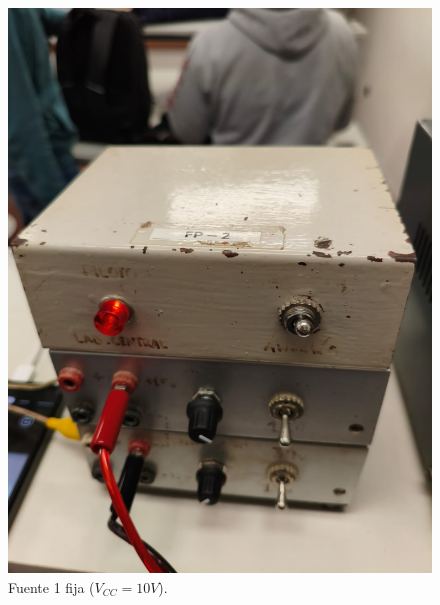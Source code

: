 \documentclass[chaptersright]{informeutn}
\begin{document}
\begin{figure}[H]
\begin{minipage}{0.40\textwidth}
          \includegraphics[width=\textwidth]{pictures/fuente1.jpeg}
          \caption{Fuente 1 fija ($V_{CC}=10V$).}
          \label{fig:fuente1}
        \end{minipage}
        \begin{minipage}{0.40\textwidth}
          \centering

\end{minipage}
\end{figure}
\end{document}
